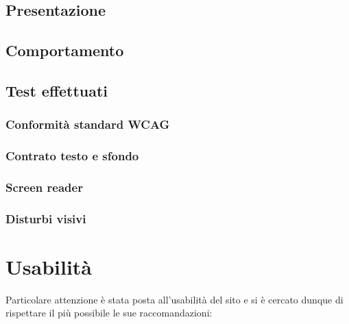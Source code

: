 \documentclass[12pt]{article}
\begin{document}
	\subsection{Presentazione}

	\subsection{Comportamento}

	\subsection{Test effettuati}
		\subsubsection{Conformità standard WCAG}
		\subsubsection{Contrato testo e sfondo}
		\subsubsection{Screen reader}		
		\subsubsection{Disturbi visivi}
		
\section{Usabilità}
Particolare attenzione è stata posta all’usabilità del sito e si è cercato dunque di rispettare il più possibile le sue raccomandazioni:
\end{document}
